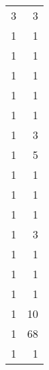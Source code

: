 \begin{tabular}{rr}
                  3 &             3 \\
                  1 &             1 \\
                  1 &             1 \\
                  1 &             1 \\
                  1 &             1 \\
                  1 &             1 \\
                  1 &             3 \\
                  1 &             5 \\
                  1 &             1 \\
                  1 &             1 \\
                  1 &             1 \\
                  1 &             3 \\
                  1 &             1 \\
                  1 &             1 \\
                  1 &             1 \\
                  1 &            10 \\
                  1 &            68 \\
                  1 &             1 \\
\bottomrule
\end{tabular}
